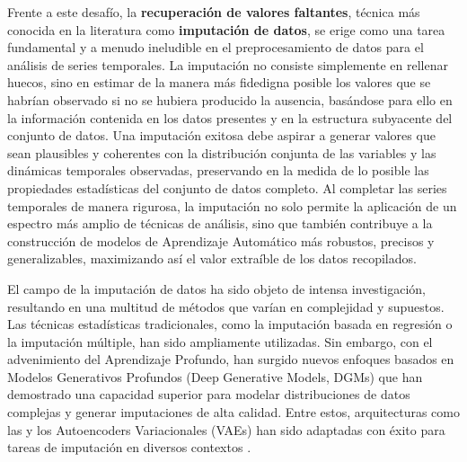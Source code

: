Frente a este desafío, la \textbf{recuperación de valores faltantes}, técnica más conocida en la literatura como \textbf{imputación de datos}, se erige como una tarea fundamental y a menudo ineludible en el preprocesamiento de datos para el análisis de series temporales. La imputación no consiste simplemente en rellenar huecos, sino en estimar de la manera más fidedigna posible los valores que se habrían observado si no se hubiera producido la ausencia, basándose para ello en la información contenida en los datos presentes y en la estructura subyacente del conjunto de datos. Una imputación exitosa debe aspirar a generar valores que sean plausibles y coherentes con la distribución conjunta de las variables y las dinámicas temporales observadas, preservando en la medida de lo posible las propiedades estadísticas del conjunto de datos completo. Al completar las series temporales de manera rigurosa, la imputación no solo permite la aplicación de un espectro más amplio de técnicas de análisis, sino que también contribuye a la construcción de modelos de Aprendizaje Automático más robustos, precisos y generalizables, maximizando así el valor extraíble de los datos recopilados.

El campo de la imputación de datos ha sido objeto de intensa investigación, resultando en una multitud de métodos que varían en complejidad y supuestos. Las técnicas estadísticas tradicionales, como la imputación basada en regresión o la imputación múltiple, han sido ampliamente utilizadas. Sin embargo, con el advenimiento del Aprendizaje Profundo, han surgido nuevos enfoques basados en Modelos Generativos Profundos (Deep Generative Models, DGMs) que han demostrado una capacidad superior para modelar distribuciones de datos complejas y generar imputaciones de alta calidad. Entre estos, arquitecturas como las  y los Autoencoders Variacionales (VAEs) han sido adaptadas con éxito para tareas de imputación en diversos contextos \citep{de_deep_2022}.

